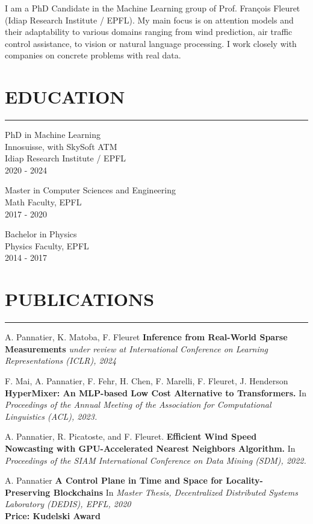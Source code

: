 \documentclass{article}
\let\oldhrule\hrule
\renewcommand{\hrule}{\color{lightgray}\oldhrule\color{black}}
\newcommand{\rubric}[1]{
    \color{mediumgray}

    \section*{\montserratlight \large \MakeUppercase{#1}} 
    \hrule
    \vspace{4mm}
    \raggedright
}
\begin{document}
\vspace{4mm}
\color{deepgray}
I am a PhD Candidate in the Machine Learning group of Prof. François Fleuret (Idiap Research Institute / EPFL). My main focus is on attention models and their adaptability to various domains ranging from wind prediction, air traffic control assistance, to vision or natural language processing. I work closely with companies on concrete problems with real data. \\
\begin{minipage}[t]{0.3\textwidth}
  \rubric{Education}

  \color{deepgray}
  \large PhD in Machine Learning \\
  \color{mediumgray} \small
  Innosuisse, with SkySoft ATM \\
  Idiap Research Institute / EPFL \\
  2020 - 2024

  \vspace{4mm}
  \color{deepgray}
  \large Master in Computer Sciences and Engineering \\
  \color{mediumgray} \small
  Math Faculty, EPFL \\
  2017 - 2020

  \vspace{4mm}
  \color{deepgray}
  \large Bachelor in Physics \\
  \color{mediumgray} \small
  Physics Faculty, EPFL \\
  2014 - 2017

\end{minipage}\hfill
\begin{minipage}[t]{0.65\textwidth}
  \rubric{Publications}
  \small
  A. Pannatier, K. Matoba, F. Fleuret \textbf{Inference from Real-World Sparse Measurements} \textit{under review at International Conference on Learning Representations (ICLR), 2024}
  \vspace{4mm}

  F. Mai, A. Pannatier, F. Fehr, H. Chen, F. Marelli, F. Fleuret, J. Henderson \textbf{HyperMixer: An MLP-based Low Cost Alternative to Transformers.} In \textit{Proceedings of the Annual Meeting of the Association for Computational Linguistics (ACL), 2023.}
  \vspace{4mm}

  A. Pannatier, R. Picatoste, and F. Fleuret. \textbf{Efficient Wind Speed Nowcasting with GPU-Accelerated Nearest Neighbors Algorithm.} In \textit{Proceedings of the SIAM International Conference on Data Mining (SDM), 2022.}
  \vspace{4mm}

  A. Pannatier \textbf{A Control Plane in Time and Space for Locality-Preserving Blockchains} In \textit{Master Thesis, Decentralized Distributed Systems Laboratory (DEDIS), EPFL, 2020} \\
  \textbf{Price: Kudelski Award}
  \vspace{4mm}
\end{minipage}
\end{document}
